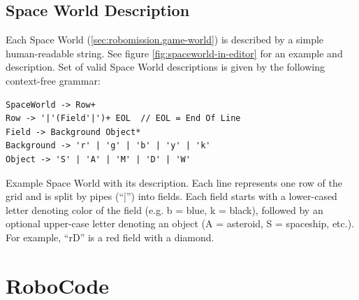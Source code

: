 \subsection{Space World Description}
\label{sec:impl.spaceworld}

Each Space World (\cref{sec:robomission.game-world}) is described by a simple
human-readable string.
See figure \ref{fig:spaceworld-in-editor} for an example and description.
Set of valid Space World descriptions is given by the
following context-free grammar:

\begin{lstlisting}
SpaceWorld -> Row+
Row -> '|'(Field'|')+ EOL  // EOL = End Of Line
Field -> Background Object*
Background -> 'r' | 'g' | 'b' | 'y' | 'k'
Object -> 'S' | 'A' | 'M' | 'D' | 'W'
\end{lstlisting}




%
{Example Space World with its description. %
Each line represents one row of the grid
and is split by pipes (``|'') into fields.
Each field starts with a lower-cased letter denoting color of the field
(e.g. b = blue, k = black),
followed by an optional upper-case letter denoting an object
(A = asteroid, S = spaceship, etc.).
For example, ``rD'' is a red field with a diamond.}



\section{RoboCode}
\label{sec:robocode}

